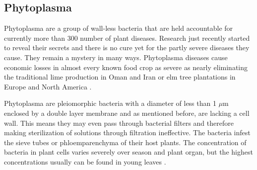 \documentclass[a4paper]{article}
\begin{document}
\subsection{Phytoplasma}
Phytoplasma are a group of wall-less bacteria that are held accountable for currently more than 300 number of plant diseases.
Research just recently started to reveal their secrets and there is no cure yet for the partly severe diseases they cause. They remain a mystery in many ways.
Phytoplasma diseases cause economic losses in almost every known food crop as severe as nearly eliminating the traditional lime production in Oman and Iran or elm tree plantations in Europe and North America \cite{p24}. 

Phytoplasma are pleiomorphic bacteria with a diameter of less than 1 $\mu$m enclosed by a double layer membrane and as mentioned before, are lacking a cell wall. This means they may even pass through bacterial filters and therefore making sterilization of solutions %
 through filtration ineffective.
The bacteria infest the sieve tubes or phloemparenchyma of their host plants. The concentration of bacteria in plant cells varies severely over season and plant organ, but the highest concentrations usually can be found in young leaves  \cite{p15}.
\end{document}
